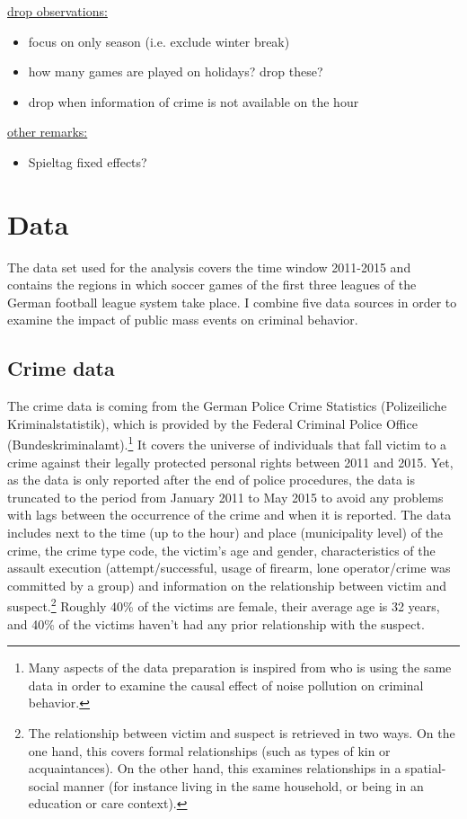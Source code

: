 \documentclass[11pt, a4paper, draft]{article} %
\begin{document}
\underline{drop observations:}
\begin{itemize}
	\item focus on only season (i.e. exclude winter break)
	\item how many games are played on holidays? drop these? 
	\item drop when information of crime is not available on the hour
\end{itemize}



\underline{other remarks:}
\begin{itemize}
	\item Spieltag fixed effects?
\end{itemize}



\newpage
\section{Data}\label{sec_soc_ext:data} 
The data set used for the analysis covers the time window 2011-2015 and contains the regions in which soccer games of the first three leagues of the German football league system take place. I combine five data sources in order to examine the impact of public mass events on criminal behavior.



\subsection{Crime data}
The crime data is coming from the German Police Crime Statistics (Polizeiliche Kriminalstatistik), which is provided by the Federal Criminal Police Office (Bundeskriminalamt).\footnote{Many aspects of the data preparation is inspired from \cite{hener2019noise} who is using the same data in order to examine the causal effect of noise pollution on criminal behavior.} It covers the universe of individuals that fall victim to a crime against their legally protected personal rights between 2011 and 2015. Yet, as the data is only reported after the end of police procedures, the data is truncated to the period from January 2011 to May 2015 to avoid any problems with lags between the occurrence of the crime and when it is reported. The data includes next to the time (up to the hour) and place (municipality level) of the crime, the crime type code, the victim's age and gender, characteristics of the assault execution (attempt/successful, usage of firearm, lone operator/crime was committed by a group) and information on the relationship between victim and suspect.\footnote{The relationship between victim and suspect is retrieved in two ways. On the one hand, this covers formal relationships (such as types of kin or acquaintances). On the other hand, this examines relationships in a spatial-social manner (for instance living in the same household, or being in an education or care context).} Roughly 40\% of the victims are female, their average age is 32 years, and 40\% of the victims haven't had any prior relationship with the suspect.
\end{document}
